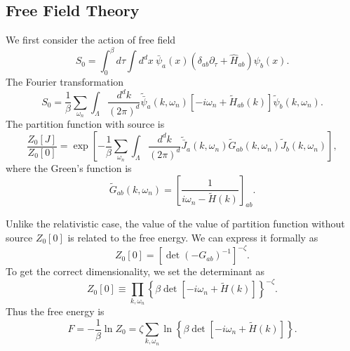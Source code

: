 \subsection{Free Field Theory}
We first consider the action of free field
\begin{equation}
	S_0 = \int_0^\beta d\tau \int d^dx\ \bar\psi_a(x) (\delta_{ab}\partial_\tau+\hat H_{ab})\psi_b(x).
\end{equation}
The Fourier transformation
\begin{equation}
	S_0 = \frac{1}{\beta}\sum_{\omega_n} \int_{\Lambda} \frac{d^dk}{(2\pi)^d}
	\tilde{\bar{\psi}}_a(k,\omega_n)\left[-i\omega_n + \tilde{H}_{ab}(k)\right]\tilde{\psi}_b(k,\omega_n).
\end{equation}
The partition function with source is
\begin{equation}
	\frac{Z_0[J]}{Z_0[0]} = \exp\left[-\frac{1}{\beta}\sum_{\omega_n} \int_{\Lambda} \frac{d^dk}{(2\pi)^d}\tilde{\bar J}_a(k,\omega_n) \tilde{G}_{ab}(k,\omega_n) \tilde{J}_b(k,\omega_n) \right],
\end{equation}
where the Green's function is
\begin{equation}
	\tilde{G}_{ab}(k,\omega_n) = \left[\frac{1}{i\omega_n - \tilde{H}(k)}\right]_{ab}.
\end{equation}

\begin{framedrmk}
Unlike the relativistic case, the value of the value of partition function without source $Z_0[0]$ is related to the free energy.
We can express it formally as
\begin{equation*}
	Z_0[0]= \left[\det (-G_{ab})^{-1}\right]^{-\zeta}.
\end{equation*}
To get the correct dimensionality, we set the determinant as
\begin{equation*}
	Z_0[0] \equiv \prod_{k,\omega_n}\left\{\beta \det\left[-i\omega_n+\tilde{H}(k)\right]\right\}^{-\zeta}.
\end{equation*}
Thus the free energy is
\begin{equation}
	F = -\frac{1}{\beta} \ln Z_0
	= \zeta \sum_{k,\omega_n} \ln\left\{\beta\det\left[-i\omega_n+\tilde{H}(k)\right]\right\}.
\end{equation}
\end{framedrmk}

